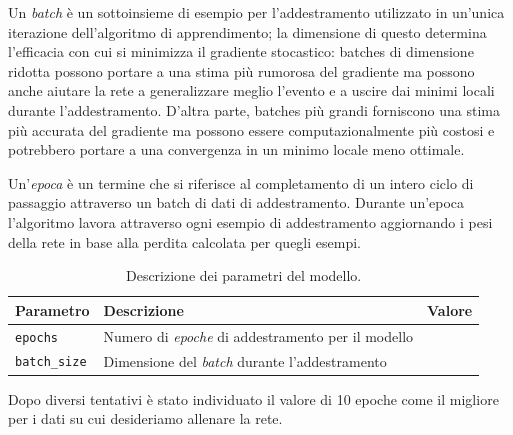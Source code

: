     Un \textit{batch} è un sottoinsieme di esempio per l’addestramento utilizzato in un’unica iterazione dell’algoritmo di apprendimento; la dimensione di questo determina l’efficacia con cui si minimizza il gradiente stocastico: batches di dimensione ridotta possono portare a una stima più rumorosa del gradiente ma possono anche aiutare la rete a generalizzare meglio l’evento e a uscire dai minimi locali durante l’addestramento. D’altra parte, batches più grandi forniscono una stima più accurata del gradiente ma possono essere computazionalmente più costosi e potrebbero portare a una convergenza in un minimo locale meno ottimale.

    Un’\textit{epoca} è un termine che si riferisce al completamento di un intero ciclo di passaggio attraverso un batch di dati di addestramento. Durante un’epoca l’algoritmo lavora attraverso ogni esempio di addestramento aggiornando i pesi della rete in base alla perdita calcolata per quegli esempi.

        \begin{table}[h]
            \centering
            \begin{tabular}{|>{\centering\arraybackslash}m{4.1cm}|>{\centering\arraybackslash}m{6cm}|>{\centering\arraybackslash}m{3.5cm}|}
                \hline
                \textbf{Parametro} & \textbf{Descrizione} & \textbf{Valore} \\
                \hline
                \texttt{epochs} & Numero di \textit{epoche} di addestramento per il modello & 10 \\
                \hline
                \texttt{batch\_size} & Dimensione del \textit{batch} durante l'addestramento & 32 \\
                \hline
            \end{tabular}
            \caption{Descrizione dei parametri del modello.}
        \end{table}

    Dopo diversi tentativi è stato individuato il valore di 10 epoche come il migliore per i dati su cui desideriamo allenare la rete.

